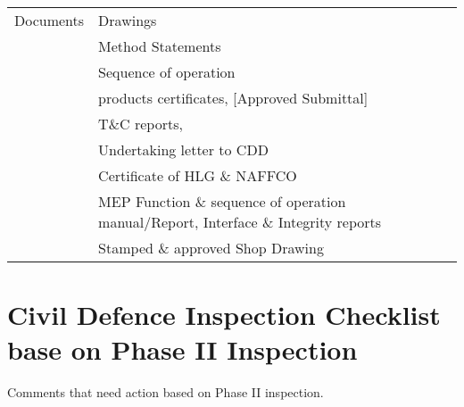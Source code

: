 {\begin{longtable}{p{2.3cm}p{4.2cm}p{4.2cm}}
Documents	&Drawings &\\
	&Method Statements &\\
	&Sequence of operation &\\
	&products certificates, [Approved Submittal] &\\
	&T\&C reports, &\\
	&Undertaking letter to CDD &\\
	&Certificate of HLG \& NAFFCO &\\
	&MEP Function \& sequence of operation manual/Report, Interface \& Integrity reports &\\
	&Stamped \& approved Shop Drawing &\\
\bottomrule
\end{longtable}
}

\section{Civil Defence Inspection Checklist base on Phase II Inspection}

Comments that need action based on Phase II inspection.







